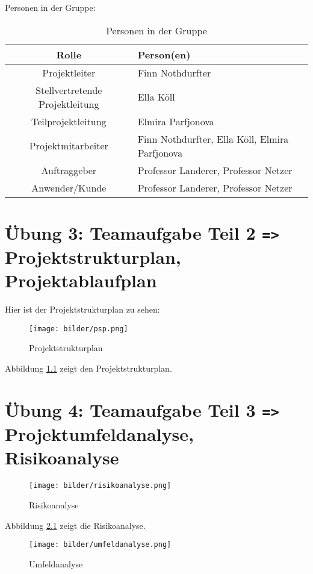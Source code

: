 \documentclass[a4paper,12pt]{report}
\begin{document}
Personen in der Gruppe:

\begin{table}[h]
    \centering
    \begin{tabular}{|c|l|}
        \hline
        \textbf{Rolle} & \textbf{Person(en)} \\
        \hline
        Projektleiter & Finn Nothdurfter \\
        Stellvertretende Projektleitung & Ella Köll \\
        Teilprojektleitung & Elmira Parfjonova \\
        Projektmitarbeiter & Finn Nothdurfter, Ella Köll, Elmira Parfjonova \\
        Auftraggeber & Professor Landerer, Professor Netzer \\
        Anwender/Kunde & Professor Landerer, Professor Netzer \\
        \hline
    \end{tabular}
    \caption{Personen in der Gruppe}
    \label{tab:personen}
\end{table}

\chapter{Übung 3: Teamaufgabe Teil 2 \texttt{=>} Projektstrukturplan, Projektablaufplan}

Hier ist der Projektstrukturplan zu sehen:

\begin{figure}[h]
    \centering
    \texttt{[image: bilder/psp.png]}
    \caption{Projektstrukturplan}
    \label{fig:psp}
\end{figure}

Abbildung \ref{fig:psp} zeigt den Projektstrukturplan.

\chapter{Übung 4: Teamaufgabe Teil 3 \texttt{=>} Projektumfeldanalyse, Risikoanalyse}

\begin{figure}[h]
    \centering
    \texttt{[image: bilder/risikoanalyse.png]}
    \caption{Risikoanalyse}
    \label{fig:risikoanalyse}
\end{figure}

Abbildung \ref{fig:risikoanalyse} zeigt die Risikoanalyse.

\begin{figure}[h]
    \centering
    \texttt{[image: bilder/umfeldanalyse.png]}
    \caption{Umfeldanalyse}
    \label{fig:umfeldanalyse}
\end{figure}
\end{document}
